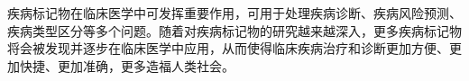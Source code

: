 



疾病标记物在临床医学中可发挥重要作用，可用于处理疾病诊断、疾病风险预测、疾病类型区分等多个问题。随着对疾病标记物的研究越来越深入，更多疾病标记物将会被发现并逐步在临床医学中应用，从而使得临床疾病治疗和诊断更加方便、更加快捷、更加准确，更多造福人类社会。

